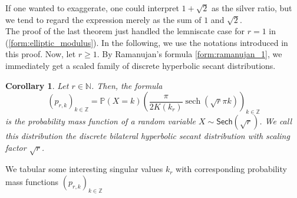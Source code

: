\documentclass[12pt]{amsart}
\newtheorem{cor}[theorem]{Corollary}
\theoremstyle{definition}
\theoremstyle{remark}
\numberwithin{equation}{section}
\newcommand{\1}{\mathbbm{1}}
\begin{document}
\vspace{1cm}

If one wanted to exaggerate, one could interpret $1 + \sqrt{2}$  as the silver ratio, but we tend to regard the expression merely as the sum of $1$ and $\sqrt{2}$.\\

The proof of the last theorem just handled the lemniscate case for $r=1$ in (\ref{form:elliptic_modulus}). In the following, we use the notations introduced in this proof. Now, let $r \ge 1$. By Ramanujan's formula \ref{form:ramanujan_1}, we immediately get a scaled family of discrete hyperbolic secant distributions.

\begin{cor}
Let $r \in \mathbb{N}$. Then, the formula
$$
\left(p_{r,k}\right)_{k\in\mathbb{Z}} = \mathbb{P}(X=k) \left(\frac{\pi}{2K(k_r)}\operatorname{sech} (\sqrt{r}\pi k)\right)_{k\in\mathbb{Z}}
$$
is the probability mass function of a random variable $X \sim \mathsf{Sech}(\sqrt{r})$. We call this distribution the discrete bilateral hyperbolic secant distribution with scaling factor $\sqrt{r}$.
\end{cor}


We tabular some interesting singular values $k_r$ with corresponding probability mass functions $(p_{r,k})_{k \in \mathbb{Z}}$
\end{document}
